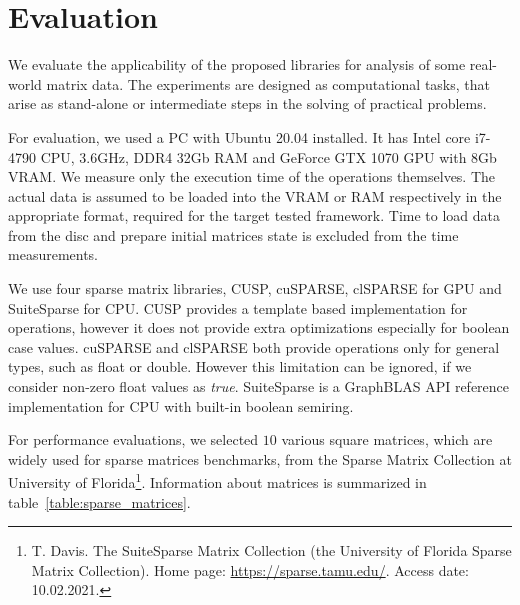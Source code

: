 \section{Evaluation}



We evaluate the applicability of the proposed libraries for analysis of some real-world matrix data.
The experiments are designed as computational tasks, that arise as stand-alone or intermediate steps in the solving of practical problems.

For evaluation, we used a PC with Ubuntu 20.04 installed.
It has Intel core i7-4790 CPU, 3.6GHz, DDR4 32Gb RAM and GeForce GTX 1070 GPU with 8Gb VRAM.
We measure only the execution time of the operations themselves.
The actual data is assumed to be loaded into the VRAM or RAM respectively in the appropriate format, required for the target tested framework.
Time to load data from the disc and prepare initial matrices state is excluded from the time measurements.

We use four sparse matrix libraries, CUSP, cuSPARSE, clSPARSE for GPU and SuiteSparse for CPU.
CUSP provides a template based implementation for operations, however it does not provide extra optimizations especially for boolean case values. cuSPARSE and clSPARSE both provide operations only for general types, such as float or double.
However this limitation can be ignored, if we consider non-zero float values as \textit{true}.
SuiteSparse is a GraphBLAS API reference implementation for CPU with built-in boolean semiring.

For performance evaluations, we selected $10$ various square matrices, which are widely used for sparse matrices benchmarks, from the Sparse Matrix Collection at University of Florida\footnote{T. Davis. The SuiteSparse Matrix Collection (the University of Florida Sparse Matrix Collection). Home page: \url{https://sparse.tamu.edu/}. Access date: 10.02.2021.}.
Information about matrices is summarized in table~\ref{table:sparse_matrices}.

